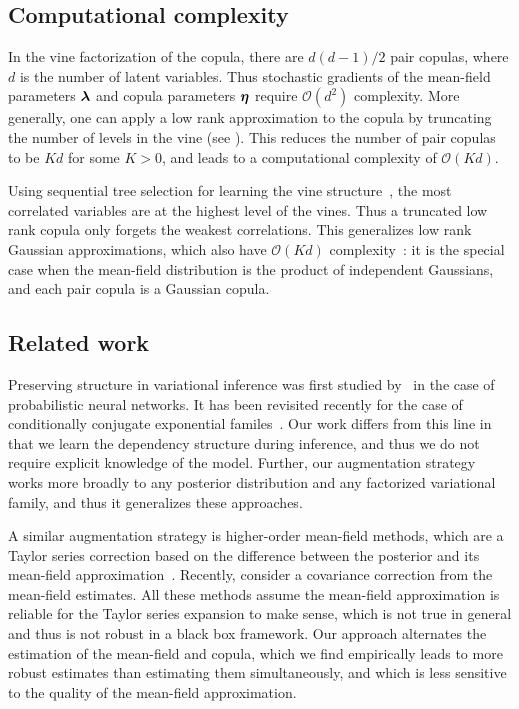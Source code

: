 \subsection{Computational complexity}
In the vine factorization of the copula, there are
$d(d-1)/2$ pair copulas, where $d$ is the number of
latent variables. Thus stochastic gradients of the
mean-field parameters $\boldsymbol{\mathbf{\lambda}}$ and copula parameters $\boldsymbol{\mathbf{\eta}}$
require $\mathcal{O}(d^2)$ complexity.
More generally, one can apply a low rank approximation to the copula
by truncating the number of levels in the vine (see
). This reduces the number of pair copulas to be
$Kd$ for some $K>0$, and leads to a computational complexity of
$\mathcal{O}(Kd)$.

Using sequential tree selection for learning the vine
structure~\citep{dissmann2012selecting}, the most correlated variables
are at the highest level of the vines. Thus a truncated low rank
copula only forgets the weakest correlations.  This generalizes low
rank Gaussian approximations, which also have $\mathcal{O}(Kd)$
complexity~\citep{seeger2010gaussian}: it is the special case when the
mean-field distribution is the product of independent Gaussians, and
each pair copula is a Gaussian copula.

\subsection{Related work}
Preserving structure in variational inference was first studied
by~\citet{saul1995exploiting} in the case of probabilistic neural
networks. It has been revisited recently for the case of conditionally
conjugate exponential familes~\citep{hoffman2015structured}. Our work
differs from this line in that we learn the dependency
structure during inference, and thus we do not require explicit
knowledge of the model. Further, our augmentation strategy works more
broadly to any posterior distribution and any factorized variational
family, and thus it generalizes these approaches.

A similar augmentation strategy is higher-order mean-field
methods,
which are a Taylor series correction
based on the difference between the posterior and its mean-field
approximation~\citep{kappen2001second}. Recently,
\citet{giordano2015linear} consider a covariance correction from the
mean-field estimates. All these methods assume the mean-field
approximation is reliable for the Taylor series expansion to make
sense, which is not true in general and thus is not robust in a black
box framework. Our approach alternates the estimation of the
mean-field and copula, which we find empirically leads to more robust
estimates than estimating them simultaneously, and which is
less sensitive to the quality of the mean-field approximation.

